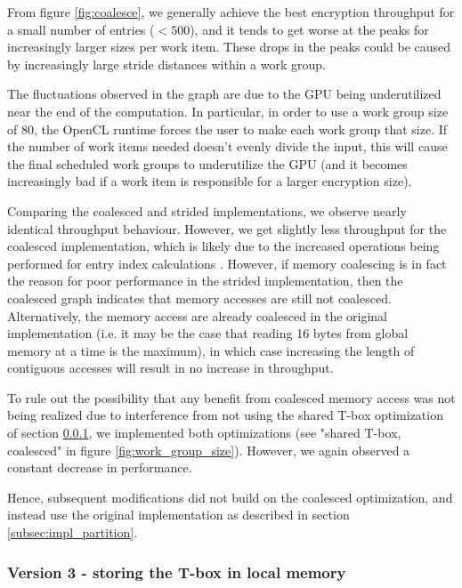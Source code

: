 \documentclass[conference,10pt]{IEEEtran}
\begin{document}
From figure \ref{fig:coalesce}, we generally achieve the best encryption throughput for a small number of 
entries ($< 500$), and it tends to get worse at the peaks for increasingly larger sizes per work item.  
These drops in the peaks could be caused by increasingly large stride distances within a work group. 

The fluctuations observed in the graph are due to the GPU being underutilized near the end of the 
computation.  In particular, in order to use a work group size of 80, the OpenCL runtime forces the user to 
make each work group that size.  If the number of work items needed doesn't evenly divide the input, this 
will cause the final scheduled work groups to underutilize the GPU (and it becomes increasingly bad if a 
work item is responsible for a larger encryption size).

Comparing the coalesced and strided implementations, we observe nearly identical throughput behaviour.  
However, we get slightly less throughput for the coalesced implementation, which is likely due to the 
increased operations being performed for entry index calculations \cite{opencl_guide}.  However, if memory 
coalescing is in fact the reason for poor performance in the strided implementation, then the coalesced 
graph indicates that memory accesses are still not coalesced.  Alternatively, the memory access are already 
coalesced in the original implementation (i.e. it may be the case that reading 16 bytes from global memory 
at a time is the maximum), in which case increasing the length of contiguous accesses will result in no 
increase in throughput.

To rule out the possibility that any benefit from coalesced memory access was not being realized due to 
interference from not using the shared T-box optimization of section \ref{subsec:impl_shared_tbox}, we 
implemented both optimizations (see "shared T-box, coalesced" in figure \ref{fig:work_group_size}).  
However, we again observed a constant decrease in performance.  

Hence, subsequent modifications did not build on the coalesced optimization, and instead use the original 
implementation as described in section \ref{subsec:impl_partition}.

\subsubsection{Version 3 - storing the T-box in local memory}
\label{subsec:impl_shared_tbox}
\end{document}
